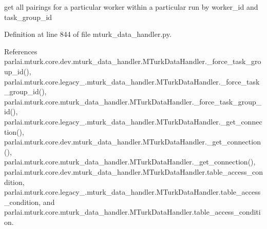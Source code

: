 \begin{DoxyVerb}get all pairings for a particular worker within a
particular run by worker_id and task_group_id
\end{DoxyVerb}
 

Definition at line 844 of file mturk\+\_\+data\+\_\+handler.\+py.



References parlai.\+mturk.\+core.\+dev.\+mturk\+\_\+data\+\_\+handler.\+M\+Turk\+Data\+Handler.\+\_\+force\+\_\+task\+\_\+group\+\_\+id(), parlai.\+mturk.\+core.\+legacy\+\_.\+mturk\+\_\+data\+\_\+handler.\+M\+Turk\+Data\+Handler.\+\_\+force\+\_\+task\+\_\+group\+\_\+id(), parlai.\+mturk.\+core.\+mturk\+\_\+data\+\_\+handler.\+M\+Turk\+Data\+Handler.\+\_\+force\+\_\+task\+\_\+group\+\_\+id(), parlai.\+mturk.\+core.\+legacy\+\_.\+mturk\+\_\+data\+\_\+handler.\+M\+Turk\+Data\+Handler.\+\_\+get\+\_\+connection(), parlai.\+mturk.\+core.\+dev.\+mturk\+\_\+data\+\_\+handler.\+M\+Turk\+Data\+Handler.\+\_\+get\+\_\+connection(), parlai.\+mturk.\+core.\+mturk\+\_\+data\+\_\+handler.\+M\+Turk\+Data\+Handler.\+\_\+get\+\_\+connection(), parlai.\+mturk.\+core.\+dev.\+mturk\+\_\+data\+\_\+handler.\+M\+Turk\+Data\+Handler.\+table\+\_\+access\+\_\+condition, parlai.\+mturk.\+core.\+legacy\+\_.\+mturk\+\_\+data\+\_\+handler.\+M\+Turk\+Data\+Handler.\+table\+\_\+access\+\_\+condition, and parlai.\+mturk.\+core.\+mturk\+\_\+data\+\_\+handler.\+M\+Turk\+Data\+Handler.\+table\+\_\+access\+\_\+condition.

